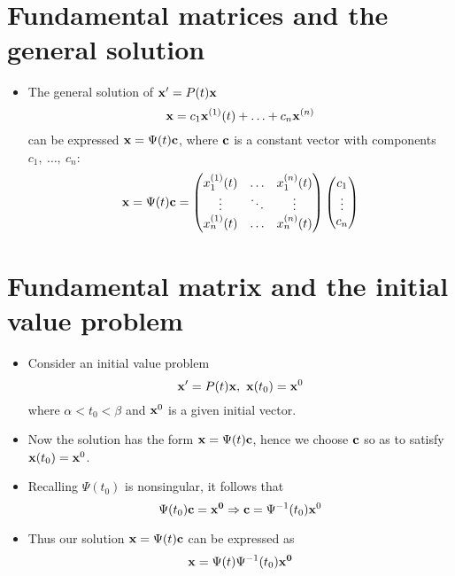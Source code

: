 \documentclass[11pt,a4paper]{article}
\begin{document}
	\section*{Fundamental matrices and the general solution}
	\begin{itemize}
		\item The general solution of $\vb{x}^\prime = P(t)\vb{x}$
		$$
		\vb{x} = c_1\vb{x}^{(1)}(t) + \ldots + c_n\vb{x}^{(n)}
		$$
		can be expressed $\vb{x} = \Psi (t)\vb{c}$, where $\vb{c}$ is a constant vector with components $c_1,\ \ldots,\ c_n$:
		$$
		\vb{x} = \Psi(t)\vb{c}=
		\begin{pmatrix}
			x_1^{(1)}(t) & \ldots & x_1^{(n)}(t)\\
			\vdots & \ddots & \vdots\\
			x_n^{(1)}(t) & \ldots & x_n^{(n)}(t)
		\end{pmatrix}
		\begin{pmatrix}
			c_1\\
			\vdots\\
			c_n
		\end{pmatrix}
		$$
	\end{itemize}
	\section*{Fundamental matrix and the initial value problem}
	\begin{itemize}
		\item Consider an initial value problem
		$$
		\vb{x}^\prime = P(t)\vb{x},\ \vb{x}(t_0) = \vb{x}^0
		$$
		where $\alpha < t_0 < \beta$ and $\vb{x}^0$ is a given initial vector.
		\item Now the solution has the form $\vb{x} = \Psi (t)\vb{c}$, hence we choose $\vb{c}$ so as to satisfy $\vb{x}(t_0) = \vb{x}^0$. 
		\item Recalling $\Psi (t_0)$ is nonsingular, it follows that
		$$
		\Psi(t_0)\vb{c} = \vb{x^0} \Rightarrow \vb{c} = \Psi^{-1}(t_0)\vb{x}^0
		$$
		\item Thus our solution $\vb{x} = \Psi(t)\vb{c}$ can be expressed as
		$$
		\vb{x} = \Psi(t)\Psi^{-1}(t_0)\vb{x^0}
		$$
	\end{itemize}
\end{document}
